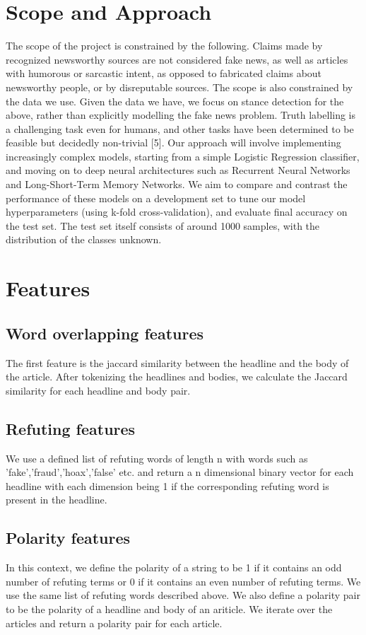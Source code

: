 \documentclass[11pt]{extarticle}
\begin{document}
\section{Scope and Approach}
The scope of the project is constrained by the following.
Claims made by recognized newsworthy sources are not considered fake news, as well as articles with humorous or sarcastic intent, as opposed to fabricated claims about newsworthy people, or by disreputable sources. 
The scope is also constrained by the data we use. Given the data we have, we focus on stance detection for the above, rather than explicitly modelling the fake news problem. Truth labelling is a challenging task even for humans, and other tasks have been determined to be feasible but decidedly non-trivial [5].
Our approach will involve implementing increasingly complex models, starting from a simple Logistic Regression classifier, and moving on to deep neural architectures such as Recurrent Neural Networks and Long-Short-Term Memory Networks. We aim to compare and contrast the performance of these models on a development set to tune our model hyperparameters (using k-fold cross-validation), and evaluate final accuracy on the test set. The test set itself consists of around 1000 samples, with the distribution of the classes unknown.


\section{Features}
\subsection{Word overlapping features}
The first feature is the jaccard similarity between the headline and the body of the article. After tokenizing the headlines and bodies, we calculate the Jaccard similarity for each headline and body pair.

\subsection{Refuting features}
We use a defined list of refuting words of length n with words such as 'fake','fraud','hoax','false' etc. and return a n dimensional binary vector for each headline with each dimension being 1 if the corresponding refuting word is present in the headline.

\subsection{Polarity features}
In this context, we define the polarity of a string to be 1 if it contains an odd number of refuting terms or 0 if it contains an even number of refuting terms. We use the same list of refuting words described above. We also define a polarity pair to be the polarity of a headline and body of an ariticle. We iterate over the articles and return a polarity pair for each article.
\end{document}
